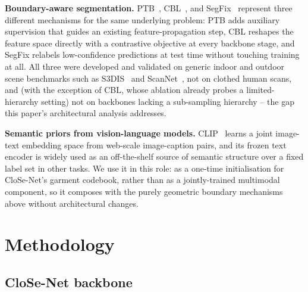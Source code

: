 \documentclass{article}
\theoremstyle{plain}
\theoremstyle{definition}
\theoremstyle{remark}
\begin{document}
\textbf{Boundary-aware segmentation.} PTB~\cite{Du_2022}, CBL~\cite{tang2022contrastive},
and SegFix~\cite{yuan2020segfixmodelagnosticboundaryrefinement} represent three
different mechanisms for the same underlying problem: PTB adds auxiliary
supervision that guides an existing feature-propagation step, CBL reshapes the
feature space directly with a contrastive objective at every backbone stage,
and SegFix relabels low-confidence predictions at test time without touching
training at all. All three were developed and validated on generic indoor and
outdoor scene benchmarks such as S3DIS~\cite{armeni20163d}
and ScanNet~\cite{dai2017scannet}, not on clothed human scans, and (with the
exception of CBL, whose ablation already probes a limited-hierarchy setting)
not on backbones lacking a sub-sampling hierarchy -- the gap this paper's
architectural analysis addresses.

\textbf{Semantic priors from vision-language models.} CLIP~\cite{radford2021clip}
learns a joint image-text embedding space from web-scale image-caption pairs,
and its frozen text encoder is widely used as an off-the-shelf source of
semantic structure over a fixed label set in other tasks. We use it in this
role: as a one-time initialisation for CloSe-Net's garment codebook, rather
than as a jointly-trained multimodal component, so it composes with the
purely geometric boundary mechanisms above without architectural changes.

\section{Methodology}
\label{sec:methodology}

\subsection{CloSe-Net backbone}
\label{sec:methodology:backbone}
\end{document}
